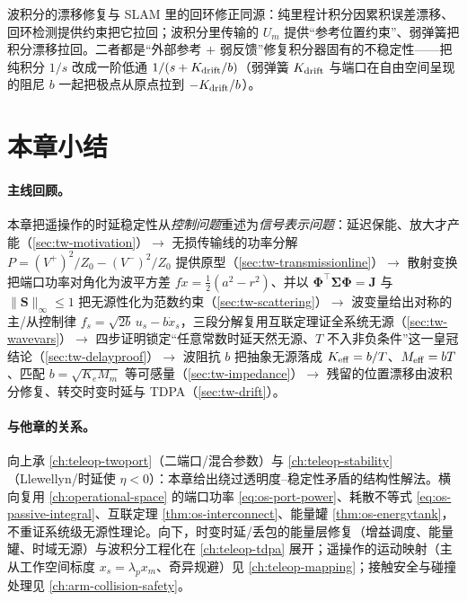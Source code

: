 \begin{insight}
波积分的漂移修复与 SLAM 里的回环修正同源：纯里程计积分因累积误差漂移、回环检测提供约束把它拉回；波积分里传输的 $U_m$ 提供“参考位置约束”、弱弹簧把积分漂移拉回。二者都是“外部参考 $+$ 弱反馈”修复积分器固有的不稳定性——把纯积分 $1/s$ 改成一阶低通 $1/(s+K_{\rm drift}/b)$（弱弹簧 $K_{\rm drift}$ 与端口在自由空间呈现的阻尼 $b$ 一起把极点从原点拉到 $-K_{\rm drift}/b$）。
\end{insight}

\section{本章小结}
\label{sec:tw-summary}

\paragraph{主线回顾。}
本章把遥操作的时延稳定性从\emph{控制问题}重述为\emph{信号表示问题}：延迟保能、放大才产能（\cref{sec:tw-motivation}）$\to$ 无损传输线的功率分解 $P=(V^+)^2/Z_0-(V^-)^2/Z_0$ 提供原型（\cref{sec:tw-transmissionline}）$\to$ 散射变换把端口功率对角化为波平方差 $f\dot x=\tfrac12(a^2-r^2)$、并以 $\boldsymbol\Phi^\top\boldsymbol\Sigma\boldsymbol\Phi=\mathbf J$ 与 $\|\mathbf S\|_\infty\le1$ 把无源性化为范数约束（\cref{sec:tw-scattering}）$\to$ 波变量给出对称的主/从控制律 $f_s=\sqrt{2b}\,u_s-b\dot x_s$，三段分解复用互联定理证全系统无源（\cref{sec:tw-wavevars}）$\to$ 四步证明锁定“任意常数时延天然无源、$T$ 不入非负条件”这一皇冠结论（\cref{sec:tw-delayproof}）$\to$ 波阻抗 $b$ 把抽象无源落成 $K_{\rm eff}=b/T$、$M_{\rm eff}=bT$、匹配 $b=\sqrt{K_eM_m}$ 等可感量（\cref{sec:tw-impedance}）$\to$ 残留的位置漂移由波积分修复、转交时变时延与 TDPA（\cref{sec:tw-drift}）。

\paragraph{与他章的关系。}
向上承 \cref{ch:teleop-twoport}（二端口/混合参数）与 \cref{ch:teleop-stability}（Llewellyn/时延使 $\eta<0$）：本章给出绕过透明度--稳定性矛盾的结构性解法。横向复用 \cref{ch:operational-space} 的端口功率 \cref{eq:os-port-power}、耗散不等式 \cref{eq:os-passive-integral}、互联定理 \cref{thm:os-interconnect}、能量罐 \cref{thm:os-energytank}，不重证系统级无源性理论。向下，时变时延/丢包的能量层修复（增益调度、能量罐、时域无源）与波积分工程化在 \cref{ch:teleop-tdpa} 展开；遥操作的运动映射（主从工作空间标度 $x_s=\lambda_p x_m$、奇异规避）见 \cref{ch:teleop-mapping}；接触安全与碰撞处理见 \cref{ch:arm-collision-safety}。

